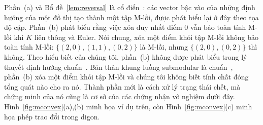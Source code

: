 \documentclass[pdflatex,sn-mathphys-num]{sn-jnl}
\theoremstyle{thmstyleone}
\theoremstyle{thmstyletwo}
\theoremstyle{thmstylethree}
\begin{document}
Phần~(a) và Bổ đề~\ref{lem:reversal} là cổ điển~\cite{hakimi1965,frank1980,frank2011}: các vector bậc vào của những định hướng của một đồ thị tạo thành một tập M-lồi, được phát biểu lại ở đây theo tọa độ cặp. Phần~(b) phát biểu rằng việc xóa duy nhất điểm $0$ vẫn bảo toàn tính M-lồi khi $K$ liên thông và Euler. Nói chung, xóa một điểm khỏi tập M-lồi không bảo toàn tính M-lồi: $\{(2,0),(1,1),(0,2)\}$ là M-lồi, nhưng $\{(2,0),(0,2)\}$ thì không. Theo hiểu biết của chúng tôi, phần~(b) không được phát biểu trong lý thuyết định hướng chuẩn~\cite{frank1980,frank2011}. Bản thân khung luồng submodular là chuẩn~\cite{edmonds1977,franktardos1988,cunningham1985,fujishige2005}, phần~(b) xóa một điểm khỏi tập M-lồi và chúng tôi không biết tính chất đóng tổng quát nào cho ra nó. Thành phần mới là cách xử lý trạng thái chết, mà chứng minh của nó cũng là cơ sở của các chứng nhận vô nghiệm dưới đây. Hình~\ref{fig:mconvex}(a),(b) minh họa ví dụ trên, còn Hình~\ref{fig:mconvex}(c) minh họa phép trao đổi trong digon.
\end{document}
